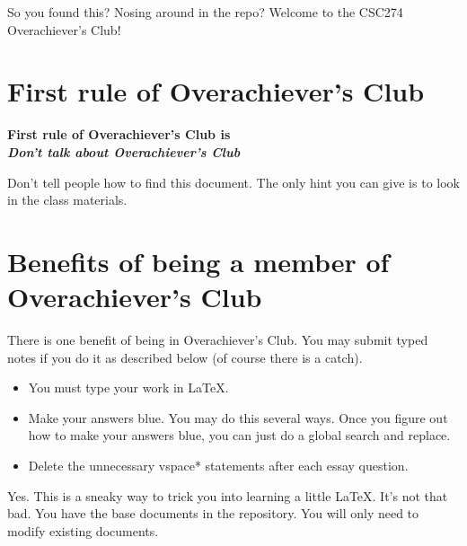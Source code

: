 \documentclass{article}
\begin{document}
So you found this?  Nosing around in the repo?  Welcome to the CSC274 Overachiever's Club!

\section*{First rule of Overachiever's Club}
\begin{center}
    \textbf{First rule of Overachiever's Club is \\\emph{Don't talk about Overachiever's Club}}
\end{center}

Don't tell people how to find this document.  The only hint you can give is to look in the class materials.

\section*{Benefits of being a member of Overachiever's Club}

There is one benefit of being in Overachiever's Club.  You may submit typed notes if you do it as
described below (of course there is a catch).
\begin{itemize}
    \item You must type your work in \LaTeX.
    \item Make your answers blue.  You may do this several ways. Once you figure out how to make your answers blue, you can just do a global search and replace.
    \item Delete the unnecessary vspace* statements after each essay question.
\end{itemize}

Yes.  This is a sneaky way to trick you into learning a little \LaTeX.  
It's not that bad.  You have the base documents in the repository. 
You will only need to modify existing documents.
\end{document}
